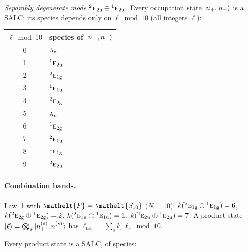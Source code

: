 \documentclass[11pt]{article}
\newcommand{\eltfont}[1]{{\let\sigma\eltsigma\mathelt{#1}}}
\newcommand{\irr}[1]{\text{\normalfont\scshape #1}}
\newcommand{\conjpair}[1]{{}^{#1}}
\newcommand{\elt}[1]{\eltfont{#1}}
\newcommand{\ptag}[1]{\mathrm{#1}}
\newcommand{\pel}{\elt{P}}             %
\begin{document}
\emph{Separably degenerate mode $\conjpair{2}\irr{e}_{2\ptag{u}}\oplus \conjpair{1}\irr{e}_{2\ptag{u}}$.} Every occupation state $\ket{n_+,n_-}$ is a SALC; its species depends only on $\ell\bmod 10$ (all integers $\ell$):
\begin{longtable}{c l}\hline $\ell\bmod 10$ & species of $\ket{n_+,n_-}$\\ \hline\endhead
0 & $\irr{a}_{\ptag{g}}$\\
1 & $\conjpair{1}\irr{e}_{2\ptag{u}}$\\
2 & $\conjpair{2}\irr{e}_{1\ptag{g}}$\\
3 & $\conjpair{1}\irr{e}_{1\ptag{u}}$\\
4 & $\conjpair{2}\irr{e}_{2\ptag{g}}$\\
5 & $\irr{a}_{\ptag{u}}$\\
6 & $\conjpair{1}\irr{e}_{2\ptag{g}}$\\
7 & $\conjpair{2}\irr{e}_{1\ptag{u}}$\\
8 & $\conjpair{1}\irr{e}_{1\ptag{g}}$\\
9 & $\conjpair{2}\irr{e}_{2\ptag{u}}$\\
\hline\end{longtable}

\paragraph{Combination bands.}

Law~1 with $\pel=\elt{S_{10}}$ ($N=10$): $k(\conjpair{2}\irr{e}_{1\ptag{g}}\oplus \conjpair{1}\irr{e}_{1\ptag{g}})=6$, $k(\conjpair{2}\irr{e}_{2\ptag{g}}\oplus \conjpair{1}\irr{e}_{2\ptag{g}})=2$, $k(\conjpair{2}\irr{e}_{1\ptag{u}}\oplus \conjpair{1}\irr{e}_{1\ptag{u}})=1$, $k(\conjpair{2}\irr{e}_{2\ptag{u}}\oplus \conjpair{1}\irr{e}_{2\ptag{u}})=7$. A product state $\ket{\boldsymbol\ell}=\bigotimes_s\ket{n_+^{(s)},n_-^{(s)}}$ has $\ell_{\mathrm{tot}}=\sum_sk_s\ell_s\bmod 10$.

Every product state is a SALC, of species:
\end{document}
